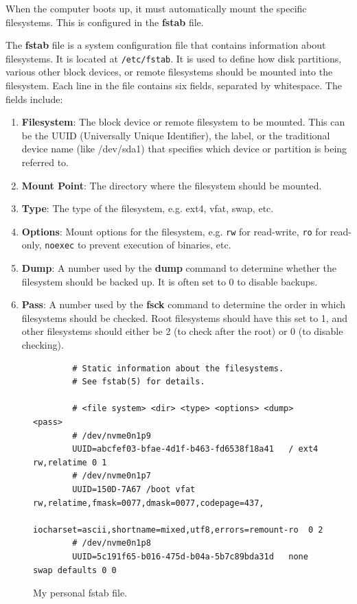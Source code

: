 \documentclass{article}
\begin{document}
    When the computer boots up, it must automatically mount the specific filesystems. This is configured in the \textbf{fstab} file. 

    \begin{definition}[fstab]
      The \textbf{fstab} file is a system configuration file that contains information about filesystems. It is located at \texttt{/etc/fstab}. It is used to define how disk partitions, various other block devices, or remote filesystems should be mounted into the filesystem. 
      Each line in the file contains six fields, separated by whitespace. The fields include: 
      \begin{enumerate} 
        \item \textbf{Filesystem}: The block device or remote filesystem to be mounted. This can be the UUID (Universally Unique Identifier), the label, or the traditional device name (like /dev/sda1) that specifies which device or partition is being referred to.
        \item \textbf{Mount Point}: The directory where the filesystem should be mounted. 
        \item \textbf{Type}: The type of the filesystem, e.g. ext4, vfat, swap, etc.
        \item \textbf{Options}: Mount options for the filesystem, e.g. \texttt{rw} for read-write, \texttt{ro} for read-only, \texttt{noexec} to prevent execution of binaries, etc.
        \item \textbf{Dump}: A number used by the \textbf{dump} command to determine whether the filesystem should be backed up. It is often set to $0$ to disable backups. 
        \item \textbf{Pass}: A number used by the \textbf{fsck} command to determine the order in which filesystems should be checked. Root filesystems should have this set to 1, and other filesystems should either be 2 (to check after the root) or 0 (to disable checking). 
      \end{enumerate}
    \end{definition}
    \begin{figure}[hbt!]
      \centering 
      \begin{lstlisting} 
        # Static information about the filesystems.
        # See fstab(5) for details.

        # <file system> <dir> <type> <options> <dump> <pass>
        # /dev/nvme0n1p9
        UUID=abcfef03-bfae-4d1f-b463-fd6538f18a41	/ ext4 rw,relatime 0 1
        # /dev/nvme0n1p7
        UUID=150D-7A67 /boot vfat rw,relatime,fmask=0077,dmask=0077,codepage=437,
            iocharset=ascii,shortname=mixed,utf8,errors=remount-ro	0 2
        # /dev/nvme0n1p8
        UUID=5c191f65-b016-475d-b04a-5b7c89bda31d	none swap defaults 0 0
      \end{lstlisting}
      \caption{My personal fstab file.} 
      \label{fig:fstab}
    \end{figure}
\end{document}

